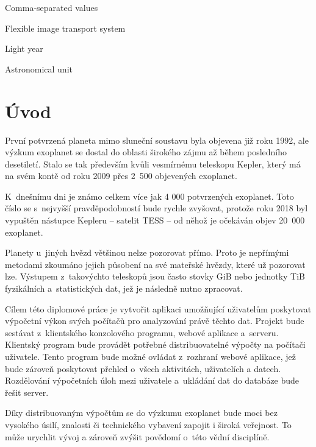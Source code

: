 \documentclass[a4paper,12pt]{article}
\begin{document}
\deskpage
\mainpage
\assignment
\statement
\acknowledgment
\annotationcs	
\annotationen
\content
\imglist
\tablelist
\codelist
\formulalist
\shortlist

\begin{description}[font=\mdseries,leftmargin=6em,labelwidth=!,]
\item[csv]      Comma-separated values
\item[fits]     Flexible image transport system
\item[ly]		Light year
\item[au]		Astronomical unit
\end{description}

\clearpage\pagestyle{plain}
\section*{Úvod}
\label{uvod}

První potvrzená planeta mimo sluneční soustavu byla objevena již roku 1992, ale výzkum exoplanet se dostal do oblasti širokého zájmu až během posledního desetiletí. Stalo se tak především kvůli vesmírnému teleskopu Kepler, který má na svém kontě od roku 2009 přes 2~500 objevených exoplanet.

K~dnešnímu dni je známo celkem více jak 4 000 potvrzených exoplanet. Toto číslo se s~nejvyšší pravděpodobností bude rychle zvyšovat, protože roku 2018 byl vypuštěn nástupce Kepleru -- satelit TESS -- od něhož je očekáván objev 20~000 exoplanet.

Planety u~jiných hvězd většinou nelze pozorovat přímo. Proto je nepřímými metodami zkoumáno jejich působení na své mateřské hvězdy, které už pozorovat lze. Výstupem z~takovýchto teleskopů jsou často stovky GiB nebo jednotky TiB fyzikálních a~statistických dat, jež je následně nutno zpracovat.

Cílem této diplomové práce je vytvořit aplikaci umožňující uživatelům poskytovat výpočetní výkon svých počítačů pro analyzování právě těchto dat. Projekt bude sestávat z~klientského konzolového programu, webové aplikace a~serveru. Klientský program bude provádět potřebné distribuovatelné výpočty na počítači uživatele. Tento program bude možné ovládat z~rozhraní webové aplikace, jež bude zároveň poskytovat přehled o~všech aktivitách, uživatelích a datech. Rozdělování výpočetních úloh mezi uživatele a~ukládání dat do databáze bude řešit server.

Díky distribuovaným výpočtům se do výzkumu exoplanet bude moci bez vysokého úsilí, znalosti či technického vybavení zapojit i široká veřejnost. To může urychlit vývoj a zároveň zvýšit povědomí o~této vědní disciplíně.
\end{document}
